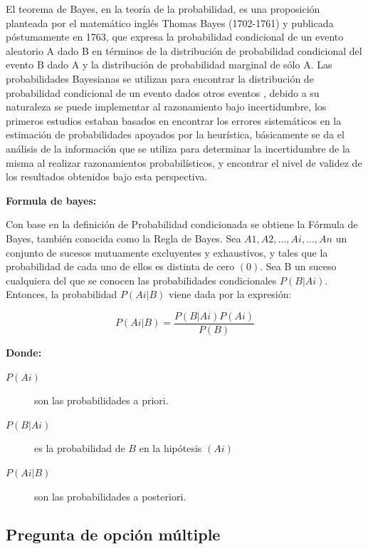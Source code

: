 El teorema de Bayes, en la teoría de la probabilidad, es una proposición planteada por el matemático inglés Thomas Bayes (1702-1761) \citep{bayes} y publicada póstumamente en 1763, que expresa la probabilidad condicional de un evento aleatorio A dado B en términos de la distribución de probabilidad condicional del evento B dado A y la distribución de probabilidad marginal de sólo A.
\vskip 0.1cm 
Las probabilidades Bayesianas se utilizan para encontrar la distribución de probabilidad condicional de un evento dados otros eventos , debido a su naturaleza se puede implementar al razonamiento bajo incertidumbre, los primeros estudios estaban basados en encontrar los errores sistemáticos en la estimación de probabilidades apoyados por la heurística, básicamente se da el análisis de la información que se utiliza para determinar la incertidumbre de la misma al realizar razonamientos probabilísticos, y encontrar el nivel de validez de los resultados obtenidos bajo esta perspectiva.

{\bf Formula de bayes:}\par

Con base en la definición de Probabilidad condicionada \citep{bayes_formula} se obtiene la Fórmula de Bayes, también conocida como la Regla de Bayes.
\vskip 0.5cm 
Sea ${ A 1 , A 2 , . . . , A i , . . . , A n }$ un conjunto de sucesos mutuamente excluyentes y exhaustivos, y tales que la probabilidad de cada uno de ellos es distinta de cero $(0)$. Sea B un suceso cualquiera del que se conocen las probabilidades condicionales $P ( B | A i )$. Entonces, la probabilidad $P ( A i | B )$ viene dada por la expresión: 

\[ P ( A i | B )  = \frac{P ( B | A i ) P ( A i )} {P ( B )} \]

{\bf Donde:}\par

\begin{description}
	\item[$P ( A i )$] son las probabilidades a priori.
	\item[$P ( B | A i )$] es la probabilidad de $B$ en la hipótesis $( A i )$
	\item[$P ( A i | B )$] son las probabilidades a posteriori. 
\end{description}

\subsection{Pregunta de opción múltiple}


